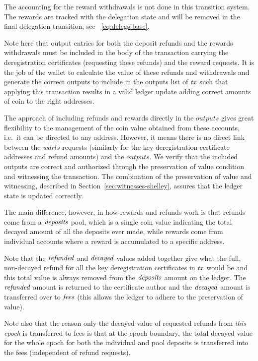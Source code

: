 The accounting for the reward withdrawals is not done in this transition system.
The rewards are tracked with the delegation state and will
be removed in the final delegation transition, see ~\ref{eq:delegs-base}.

Note here that output entries for both the deposit refunds and the rewards
withdrawals must be included in the body of the transaction
carrying the deregistration certificates (requesting these refunds) and the
reward requests. It is the job
of the wallet to calculate the value of these refunds and withdrawals and
generate the correct outputs to include in the outputs list of $\mathit{tx}$ such
that applying this transaction results in a
valid ledger update adding correct amounts of coin to the right addresses.

The approach of including refunds and rewards directly in the $outputs$ gives
great flexibility to the management of the coin value obtained from these
accounts, i.e.~it can be directed to any address. However, it means there is no
direct link between the $wdrls$ requests (similarly for the key deregistration
certificate addresses and refund amounts) and the $outputs$. We verify that
the included outputs are correct and authorized through the preservation of value condition
and witnessing the transaction. The combination of the
preservation of value and witnessing, described in Section~\ref{sec:witnesses-shelley},
assures that the ledger state is updated correctly.

The main difference, however, in how rewards and refunds work is that refunds
come from a $\mathit{deposits}$ pool, which is a single coin value indicating
the total decayed amount of all the deposits ever made, while rewards come from individual
accounts where a reward is accumulated to a specific address.

Note that the $\mathit{refunded}$ and $\mathit{decayed}$ values added together give what the
full, non-decayed refund for all the key deregistration certificates in $\mathit{tx}$
would be and this total value is always removed from the $\mathit{deposits}$
amount on the ledger. The $\mathit{refunded}$ amount is returned to the certificate
author and the $\mathit{decayed}$ amount is transferred over to $\mathit{fees}$
(this allows the ledger to adhere to the preservation of value).

Note also that the reason only the decayed value of requested refunds
from \textit{this epoch} is transferred to fees is that at the epoch
boundary, the total decayed value for the whole epoch for both the individual
and pool deposits is transferred into the fees (independent of refund
requests).

